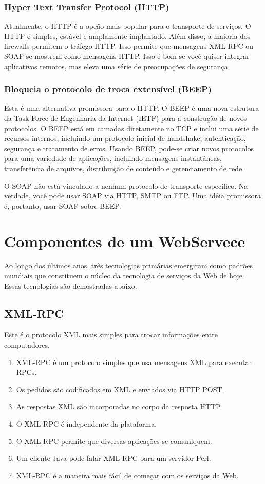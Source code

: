 \documentclass[12pt]{article}
\begin{document}
\subsubsection {Hyper Text Transfer Protocol (HTTP)}
Atualmente, o HTTP é a opção mais popular para o transporte de serviços. O HTTP é simples, estável e amplamente implantado. Além disso, a maioria dos firewalls permitem o tráfego HTTP. Isso permite que mensagens XML-RPC ou SOAP se mostrem como mensagens HTTP. Isso é bom se você quiser integrar aplicativos remotos, mas eleva uma série de preocupações de segurança.

\subsubsection {Bloqueia o protocolo de troca extensível (BEEP)}
Esta é uma alternativa promissora para o HTTP. O BEEP é uma nova estrutura da Task Force de Engenharia da Internet (IETF) para a construção de novos protocolos. O BEEP está em camadas diretamente no TCP e inclui uma série de recursos internos, incluindo um protocolo inicial de handshake, autenticação, segurança e tratamento de erros. Usando BEEP, pode-se criar novos protocolos para uma variedade de aplicações, incluindo mensagens instantâneas, transferência de arquivos, distribuição de conteúdo e gerenciamento de rede.

O SOAP não está vinculado a nenhum protocolo de transporte específico. Na verdade, você pode usar SOAP via HTTP, SMTP ou FTP. Uma idéia promissora é, portanto, usar SOAP sobre BEEP.



\section{Componentes de um WebServece}
Ao longo dos últimos anos, três tecnologias primárias emergiram como padrões mundiais que constituem o núcleo da tecnologia de serviços da Web de hoje. Essas tecnologias são demostradas abaixo.

\subsection{XML-RPC}
Este é o protocolo XML mais simples para trocar informações entre computadores.

\begin{enumerate}
	\item XML-RPC é um protocolo simples que usa mensagens XML para executar RPCs.
	\item Os pedidos são codificados em XML e enviados via HTTP POST.
	\item As respostas XML são incorporadas no corpo da resposta HTTP.
	\item O XML-RPC é independente da plataforma.
	\item O XML-RPC permite que diversas aplicações se comuniquem.
	\item Um cliente Java pode falar XML-RPC para um servidor Perl.
	\item XML-RPC é a maneira mais fácil de começar com os serviços da Web.
\end{enumerate}
\end{document}
